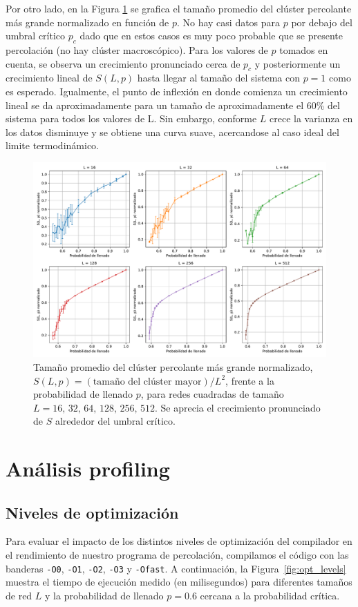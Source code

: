 \documentclass{article}
\begin{document}
Por otro lado, en la Figura \ref{fig:size} se grafica el tamaño promedio del clúster percolante más grande normalizado en función de \(p\). No hay casi datos para \(p\) por debajo del umbral crítico \(p_c\) dado que en estos casos es muy poco probable que se presente percolación (no hay clúster macroscópico). Para los valores de \(p\) tomados en cuenta, se observa un crecimiento pronunciado cerca de \(p_c\) y posteriormente un crecimiento lineal de \(S(L,p)\) hasta llegar al tamaño del sistema con \(p = 1\) como es esperado. Igualmente, el punto de inflexión en donde comienza un crecimiento lineal se da aproximadamente para un tamaño de aproximadamente el 60\% del sistema para todos los valores de L. Sin embargo, conforme \(L\) crece la varianza en los datos disminuye y se obtiene una curva suave, acercandose al caso ideal del limite termodinámico.

\begin{figure}[ht]
    \centering
    \includegraphics[width=1.0\textwidth]{figures/Size.pdf}
    \caption{Tamaño promedio del clúster percolante más grande normalizado, \(S(L,p) = ( \text{tamaño del clúster mayor} ) / L^2\), frente a la probabilidad de llenado \(p\), para redes cuadradas de tamaño \(L = 16,\,32,\,64,\,128,\,256,\,512\). Se aprecia el crecimiento pronunciado de \(S\) alrededor del umbral crítico.}
    \label{fig:size}
\end{figure}

\section{Análisis profiling}

\subsection{Niveles de optimización}
Para evaluar el impacto de los distintos niveles de optimización del compilador en el rendimiento de nuestro programa de percolación, compilamos el código con las banderas \texttt{-O0}, \texttt{-O1}, \texttt{-O2}, \texttt{-O3} y \texttt{-Ofast}. A continuación, la Figura~\ref{fig:opt_levels} muestra el tiempo de ejecución medido (en milisegundos) para diferentes tamaños de red \(L\) y la probabilidad de llenado \(p = 0.6\) cercana a la probabilidad crítica.
\end{document}
